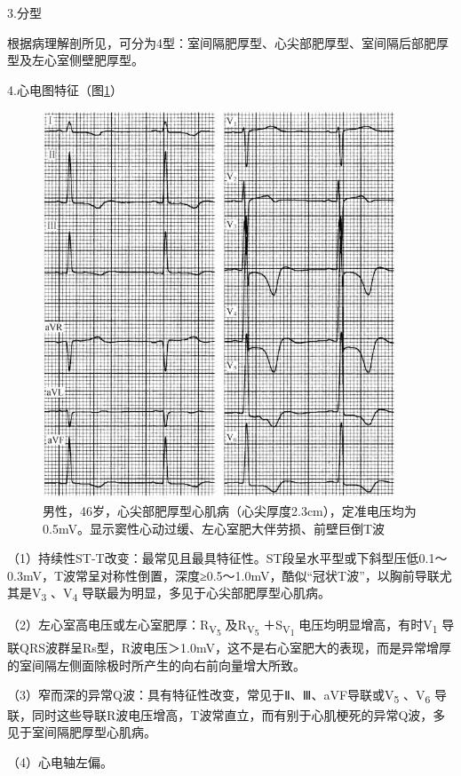 3.分型

根据病理解剖所见，可分为4型：室间隔肥厚型、心尖部肥厚型、室间隔后部肥厚型及左心室侧壁肥厚型。

4.心电图特征（图\ref{fig43-3}）

\begin{figure}[!htbp]
 \centering
 \includegraphics[width=4.15625in,height=4.54167in]{./images/Image00706.jpg}
 \captionsetup{justification=centering}
 \caption{男性，46岁，心尖部肥厚型心肌病（心尖厚度2.3cm），定准电压均为0.5mV。显示窦性心动过缓、左心室肥大伴劳损、前壁巨倒T波}
 \label{fig43-3}
  \end{figure} 

（1）持续性ST-T改变：最常见且最具特征性。ST段呈水平型或下斜型压低0.1～0.3mV，T波常呈对称性倒置，深度≥0.5～1.0mV，酷似“冠状T波”，以胸前导联尤其是V\textsubscript{3}
、V\textsubscript{4} 导联最为明显，多见于心尖部肥厚型心肌病。

（2）左心室高电压或左心室肥厚：R\textsubscript{V\textsubscript{5}}
及R\textsubscript{V\textsubscript{5}}
＋S\textsubscript{V\textsubscript{1}}
电压均明显增高，有时V\textsubscript{1}
导联QRS波群呈Rs型，R波电压＞1.0mV，这不是右心室肥大的表现，而是异常增厚的室间隔左侧面除极时所产生的向右前向量增大所致。

（3）窄而深的异常Q波：具有特征性改变，常见于Ⅱ、Ⅲ、aVF导联或V\textsubscript{5}
、V\textsubscript{6}
导联，同时这些导联R波电压增高，T波常直立，而有别于心肌梗死的异常Q波，多见于室间隔肥厚型心肌病。

（4）心电轴左偏。

